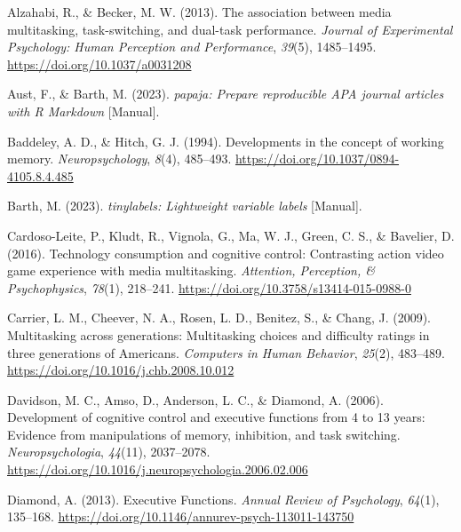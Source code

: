 \documentclass[
  man]{apa7}
\newlength{\cslhangindent}
\newenvironment{CSLReferences}[2] %
 {\begin{list}{}{%
  \setlength{\itemindent}{0pt}
  \setlength{\leftmargin}{0pt}
  \setlength{\parsep}{0pt}
  \ifodd #1
   \setlength{\leftmargin}{\cslhangindent}
   \setlength{\itemindent}{-1\cslhangindent}
  \fi
  \setlength{\itemsep}{#2\baselineskip}}}
 {\end{list}}
\begin{document}
\label{refs}
\begin{CSLReferences}{1}{0}
Alzahabi, R., \& Becker, M. W. (2013). The association between media multitasking, task-switching, and dual-task performance. \emph{Journal of Experimental Psychology: Human Perception and Performance}, \emph{39}(5), 1485--1495. \url{https://doi.org/10.1037/a0031208}

Aust, F., \& Barth, M. (2023). \emph{{papaja}: {Prepare} reproducible {APA} journal articles with {R Markdown}} {[}Manual{]}.

Baddeley, A. D., \& Hitch, G. J. (1994). Developments in the concept of working memory. \emph{Neuropsychology}, \emph{8}(4), 485--493. \url{https://doi.org/10.1037/0894-4105.8.4.485}

Barth, M. (2023). \emph{{tinylabels}: {Lightweight} variable labels} {[}Manual{]}.

Cardoso-Leite, P., Kludt, R., Vignola, G., Ma, W. J., Green, C. S., \& Bavelier, D. (2016). Technology consumption and cognitive control: {Contrasting} action video game experience with media multitasking. \emph{Attention, Perception, \& Psychophysics}, \emph{78}(1), 218--241. \url{https://doi.org/10.3758/s13414-015-0988-0}

Carrier, L. M., Cheever, N. A., Rosen, L. D., Benitez, S., \& Chang, J. (2009). Multitasking across generations: {Multitasking} choices and difficulty ratings in three generations of {Americans}. \emph{Computers in Human Behavior}, \emph{25}(2), 483--489. \url{https://doi.org/10.1016/j.chb.2008.10.012}

Davidson, M. C., Amso, D., Anderson, L. C., \& Diamond, A. (2006). Development of cognitive control and executive functions from 4 to 13 years: {Evidence} from manipulations of memory, inhibition, and task switching. \emph{Neuropsychologia}, \emph{44}(11), 2037--2078. \url{https://doi.org/10.1016/j.neuropsychologia.2006.02.006}

Diamond, A. (2013). Executive {Functions}. \emph{Annual Review of Psychology}, \emph{64}(1), 135--168. \url{https://doi.org/10.1146/annurev-psych-113011-143750}


\end{CSLReferences}
\end{document}

